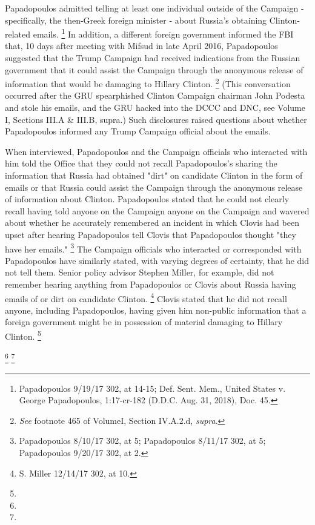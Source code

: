 Papadopoulos admitted telling at least one individual outside of the Campaign - specifically, the then-Greek foreign minister - about Russia's obtaining Clinton-related emails.%
\footnote{Papadopoulos 9/19/17 302, at 14-15;
Def. Sent. Mem., United States v. George Papadopoulos, 1:17-cr-182 (D.D.C. Aug. 31, 2018), Doc. 45.}
In addition, a different foreign government informed the FBI that, 10 days after meeting with Mifsud in late April 2016, Papadopoulos suggested that the Trump Campaign had received indications from the Russian government that it could assist the Campaign through the anonymous release of information that would be damaging to Hillary Clinton.%
\footnote{\textit{See} footnote 465 of VolumeI, Section IV.A.2.d, \textit{supra}.}
(This conversation occurred after the GRU spearphished Clinton Campaign chairman John Podesta and stole his emails, and the GRU hacked into the DCCC and DNC, see Volume I, Sections III.A \& III.B, supra.)
Such disclosures raised questions about whether Papadopoulos informed any Trump Campaign official about the emails.

When interviewed, Papadopoulos and the Campaign officials who interacted with him told the Office that they could not recall Papadopoulos's sharing the information that Russia had obtained "dirt" on candidate Clinton in the form of emails or that Russia could assist the Campaign through the anonymous release of information about Clinton.
Papadopoulos stated that he could not clearly recall having told anyone on the Campaign anyone on the Campaign and wavered about whether he accurately remembered an incident in which Clovis had been upset after hearing Papadopoulos tell Clovis that Papadopoulos thought "they have her emails."%
\footnote{Papadopoulos 8/10/17 302, at 5;
Papadopoulos 8/11/17 302, at 5;
Papadopoulos 9/20/17 302, at 2.}
The Campaign officials who interacted or corresponded with Papadopoulos have similarly stated, with varying degrees of certainty, that he did not tell them.
Senior policy advisor Stephen Miller, for example, did not remember hearing anything from Papadopoulos or Clovis about Russia having emails of or dirt on candidate Clinton.%
\footnote{S. Miller 12/14/17 302, at 10.}
Clovis stated that he did not recall anyone, including Papadopoulos, having given him non-public information that a foreign government might be in possession of material damaging to Hillary Clinton.%
\footnote{}

\footnote{}
\footnote{}

